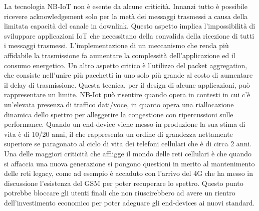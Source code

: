 \documentclass[12pt,a4paper,openright,twoside]{report}
\begin{document}
La tecnologia NB-IoT non \`e esente da alcune criticit\`a. Innanzi tutto \`e possibile ricevere acknowledgement solo per la met\`a dei messaggi trasmessi a causa della limitata capacit\`a del canale in downlink. Questo aspetto implica l'impossibilit\`a di sviluppare applicazioni IoT che necessitano della convalida della ricezione di tutti i messaggi trasmessi. L'implementazione di un meccanismo che renda pi\`u affidabile la trasmissione fa aumentare la complessit\`a dell'applicazione ed il consumo energetico.  Un altro aspetto critico \`e l'utilizzo del packet aggregation, che consiste nell'unire pi\`u pacchetti in uno solo pi\`u grande al costo di aumentare il delay di trasmissione. Questa tecnica, per il design di alcune applicazioni, pu\`o rappresentare un limite. 
NB-Iot pu\`o risentire quando opera in contesti in cui c'\`e un'elevata presenza di traffico dati/voce, in quanto opera una riallocazione dinamica dello spettro per alleggerire la congestione con ripercussioni sulle performance. 
Quando un end-device viene messo in produzione la sua stima di vita \`e di 10/20 anni, il che rappresenta un ordine di grandezza nettamente superiore se paragonato al ciclo di vita dei telefoni cellulari che \`e di circa 2 anni. 
Una delle maggiori criticit\`a che affligge il mondo delle reti cellulari \`e che quando si affaccia una nuova generazione si pongono questioni in merito al mantenimento delle reti legacy, come ad esempio \`e accaduto con l'arrivo del 4G che ha messo in discussione l'esistenza del GSM per poter recuperare lo spettro. Questo punto potrebbe bloccare gli utenti finali che non riuscirebbero ad avere un rientro dell'investimento economico per poter adeguare gli end-devices ai nuovi standard.
\end{document}
